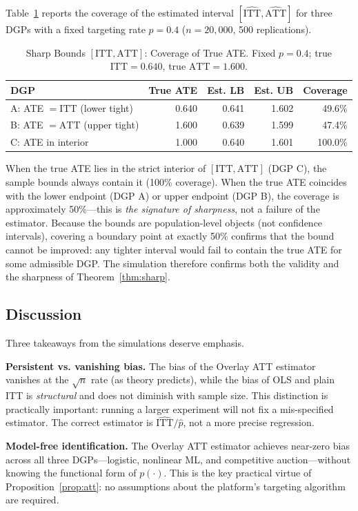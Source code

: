\documentclass[12pt]{article}
\newcommand{\ATT}{\mathrm{ATT}}
\newcommand{\ITT}{\mathrm{ITT}}
\begin{document}
Table~\ref{tab:bounds} reports the coverage of the estimated interval
$[\hat{\ITT}, \hat{\ATT}]$ for three DGPs with a fixed targeting rate
$p = 0.4$ ($n = 20{,}000$, 500 replications).

\begin{table}[h!]
\centering
\caption{Sharp Bounds $[\ITT, \ATT]$: Coverage of True ATE.
Fixed $p = 0.4$; true $\ITT = 0.640$, true $\ATT = 1.600$.}
\label{tab:bounds}
\begin{tabular}{l rrrr}
\toprule
DGP & True ATE & Est. LB & Est. UB & Coverage \\
\midrule
A: ATE $= \ITT$ (lower tight) & 0.640 & 0.641 & 1.602 & 49.6\% \\
B: ATE $= \ATT$ (upper tight) & 1.600 & 0.639 & 1.599 & 47.4\% \\
C: ATE in interior            & 1.000 & 0.640 & 1.601 & 100.0\% \\
\bottomrule
\end{tabular}
\end{table}

When the true ATE lies in the strict interior of $[\ITT, \ATT]$ (DGP C),
the sample bounds always contain it (100\% coverage). When the true ATE
coincides with the lower endpoint (DGP A) or upper endpoint (DGP B), the
coverage is approximately 50\%---this is \emph{the signature of sharpness},
not a failure of the estimator. Because the bounds are population-level
objects (not confidence intervals), covering a boundary point at exactly
50\% confirms that the bound cannot be improved: any tighter interval would
fail to contain the true ATE for some admissible DGP. The simulation
therefore confirms both the validity and the sharpness of Theorem~\ref{thm:sharp}.

\subsection{Discussion}

Three takeaways from the simulations deserve emphasis.

\textbf{Persistent vs. vanishing bias.} The bias of the Overlay ATT
estimator vanishes at the $\sqrt{n}$ rate (as theory predicts), while the
bias of OLS and plain ITT is \emph{structural} and does not diminish with
sample size. This distinction is practically important: running a larger
experiment will not fix a mis-specified estimator. The correct estimator
is $\hat{\ITT}/\hat{p}$, not a more precise regression.

\textbf{Model-free identification.} The Overlay ATT estimator achieves
near-zero bias across all three DGPs---logistic, nonlinear ML, and
competitive auction---without knowing the functional form of $p(\cdot)$.
This is the key practical virtue of Proposition~\ref{prop:att}: no
assumptions about the platform's targeting algorithm are required.
\end{document}
